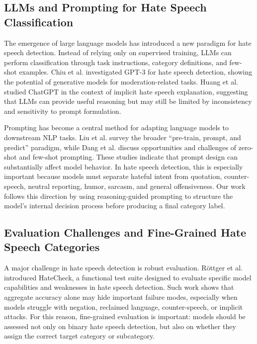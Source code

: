 \documentclass[a4paper]{article}
\begin{document}
\subsection{LLMs and Prompting for Hate Speech Classification}

The emergence of large language models has introduced a new paradigm for hate speech detection. Instead of relying only on supervised training, LLMs can perform classification through task instructions, category definitions, and few-shot examples. Chiu et al. \cite{chiu2022detecting} investigated GPT-3 for hate speech detection, showing the potential of generative models for moderation-related tasks. Huang et al. \cite{huang2023chatgpt} studied ChatGPT in the context of implicit hate speech explanation, suggesting that LLMs can provide useful reasoning but may still be limited by inconsistency and sensitivity to prompt formulation.

Prompting has become a central method for adapting language models to downstream NLP tasks. Liu et al. \cite{liu2023pre} survey the broader ``pre-train, prompt, and predict'' paradigm, while Dang et al. \cite{dang2022prompt} discuss opportunities and challenges of zero-shot and few-shot prompting. These studies indicate that prompt design can substantially affect model behavior. In hate speech detection, this is especially important because models must separate hateful intent from quotation, counter-speech, neutral reporting, humor, sarcasm, and general offensiveness. Our work follows this direction by using reasoning-guided prompting to structure the model's internal decision process before producing a final category label.

\subsection{Evaluation Challenges and Fine-Grained Hate Speech Categories}

A major challenge in hate speech detection is robust evaluation. Röttger et al. \cite{rottger2021hatecheck} introduced HateCheck, a functional test suite designed to evaluate specific model capabilities and weaknesses in hate speech detection. Such work shows that aggregate accuracy alone may hide important failure modes, especially when models struggle with negation, reclaimed language, counter-speech, or implicit attacks. For this reason, fine-grained evaluation is important: models should be assessed not only on binary hate speech detection, but also on whether they assign the correct target category or subcategory.
\end{document}
